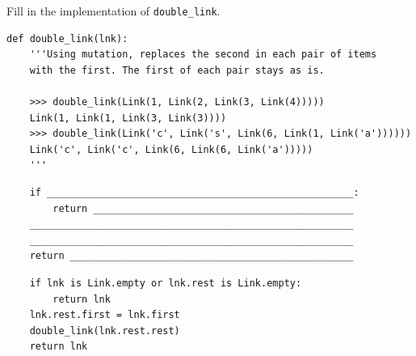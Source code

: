 \begin{blocksection}
\question Fill in the implementation of \lstinline$double_link$.

\begin{lstlisting}
def double_link(lnk):
    '''Using mutation, replaces the second in each pair of items
    with the first. The first of each pair stays as is.

    >>> double_link(Link(1, Link(2, Link(3, Link(4)))))
    Link(1, Link(1, Link(3, Link(3))))
    >>> double_link(Link('c', Link('s', Link(6, Link(1, Link('a'))))))
    Link('c', Link('c', Link(6, Link(6, Link('a')))))
    '''
\end{lstlisting}

\ifprintanswers\else
\begin{lstlisting}
    if _____________________________________________________:
        return _____________________________________________
    ________________________________________________________
    ________________________________________________________
    return _________________________________________________
\end{lstlisting}
\fi

\begin{solution}
\begin{lstlisting}
    if lnk is Link.empty or lnk.rest is Link.empty:
        return lnk
    lnk.rest.first = lnk.first
    double_link(lnk.rest.rest)
    return lnk
\end{lstlisting}
\end{solution}
\end{blocksection}
